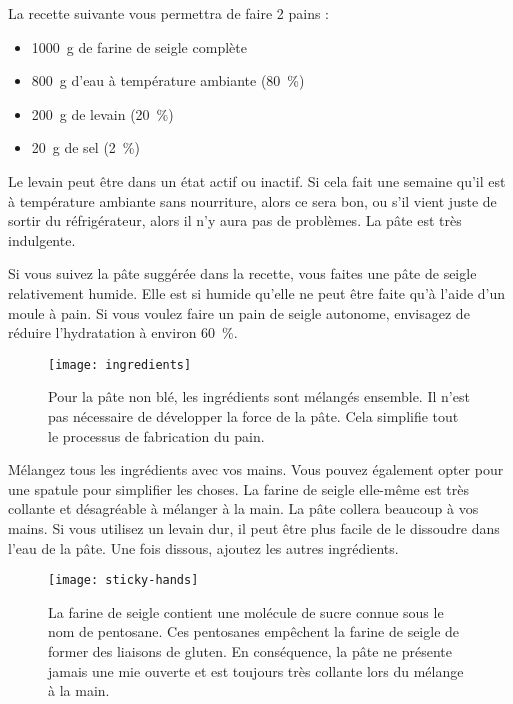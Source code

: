 La recette suivante vous permettra de faire 2 pains :
\begin{itemize}
  \item \qty{1000}{\gram} de farine de seigle complète
  \item \qty{800}{\gram} d'eau à température ambiante (\qty{80}{\percent})
  \item \qty{200}{\gram} de levain (\qty{20}{\percent})
  \item \qty{20}{\gram} de sel (\qty{2}{\percent})
\end{itemize}

Le levain peut être dans un état actif ou inactif. Si cela fait
une semaine qu'il est à température ambiante sans nourriture, alors ce sera bon, ou 
s'il vient juste de sortir du réfrigérateur, alors il n'y aura pas de problèmes.
La pâte est très indulgente.

Si vous suivez la pâte suggérée dans la recette, vous faites une pâte de seigle relativement
humide. Elle est si humide qu'elle ne peut être faite qu'à l'aide d'un moule à pain. Si
vous voulez faire un pain de seigle autonome, envisagez de réduire l'hydratation
à environ \qty{60}{\percent}.

\begin{figure}[!htb]
  \texttt{[image: ingredients]}
  \caption[Pâte non blé]{Pour la pâte non blé, les ingrédients sont mélangés
      ensemble. Il n'est pas nécessaire de développer la force de la pâte. Cela
      simplifie tout le processus de fabrication du pain.}%
  \label{fig:non-wheat-ingredients}
\end{figure}

Mélangez tous les ingrédients avec vos mains. Vous pouvez également
opter pour une spatule pour simplifier les choses. La farine de seigle elle-même est très
collante et désagréable à mélanger à la main. La pâte collera beaucoup
à vos mains. Si vous utilisez un levain dur, il peut être
plus facile de le dissoudre dans l'eau de la pâte. Une fois dissous,
ajoutez les autres ingrédients.

\begin{figure}[!htb]
  \texttt{[image: sticky-hands]}
  \caption[Pâte de seigle collante]{La farine de seigle contient une molécule de sucre connue sous le nom de pentosane.
      Ces pentosanes empêchent la farine de seigle de former des liaisons de gluten. En conséquence, la pâte ne présente jamais une mie ouverte et est toujours très collante
      lors du mélange à la main.}%
  \label{fig:non-wheat-sticky-hands}
\end{figure}

